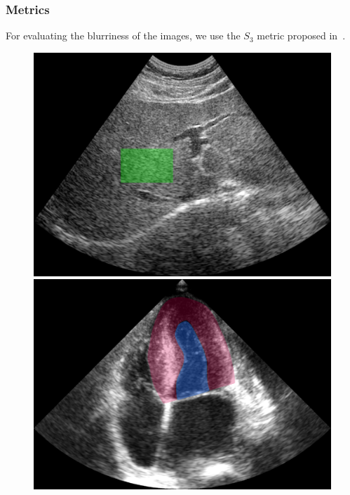 \subsubsection{Metrics}
For evaluating the blurriness of the images, we use the \(S_3\) metric proposed in~\cite{vu_bf_2012}.

\begin{figure}
  \centering
  \begin{minipage}[c]{0.2\textwidth}
    \includegraphics[width=\textwidth]{figures/liver_roi.png}
  \end{minipage}
  \begin{minipage}[c]{0.215\textwidth}
    \includegraphics[width=\textwidth]{figures/cardiac_roi.png}
  \end{minipage}
  \caption{}
\end{figure}

